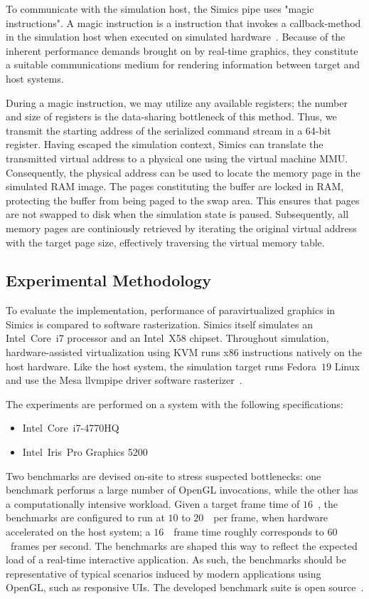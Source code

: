 To communicate with the simulation host, the Simics pipe uses "magic instructions".
A magic instruction is a  instruction that invokes a callback-method in the simulation host when executed on simulated hardware~.
Because of the inherent performance demands brought on by real-time graphics, they constitute a suitable communications medium for rendering information between target and host systems.

During a magic instruction, we may utilize any available registers; the number and size of registers is the data-sharing bottleneck of this method.
Thus, we transmit the starting address of the serialized command stream in a 64-bit register.
Having escaped the simulation context, Simics can translate the transmitted virtual address to a physical one using the virtual machine MMU.
Consequently, the physical address can be used to locate the memory page in the simulated RAM image.
The pages constituting the buffer are locked in RAM, protecting the buffer from being paged to the swap area.
This ensures that pages are not swapped to disk when the simulation state is paused.
Subsequently, all memory pages are continiously retrieved by iterating the original virtual address with the target page size, effectively traversing the virtual memory table.

\subsection{Experimental Methodology}
\label{sec:experimentalmethodology}
To evaluate the implementation, performance of paravirtualized graphics in Simics is compared to software rasterization.
Simics itself simulates an Intel\circledR ~Core\texttrademark ~i7 processor and an Intel\circledR ~X58 chipset.
Throughout simulation, hardware-assisted virtualization using KVM runs x86 instructions natively on the host hardware.
Like the host system, the simulation target runs Fedora~$19$ Linux and use the Mesa llvmpipe driver software rasterizer~.

The experiments are performed on a system with the following specifications:
\begin{itemize}
\item Intel\circledR\ Core\texttrademark\ i7-4770HQ
\item Intel\circledR\ Iris\texttrademark\ Pro Graphics 5200
\end{itemize}

Two benchmarks are devised on-site to stress suspected bottlenecks: one benchmark performs a large number of OpenGL invocations, while the other has a computationally intensive workload.
Given a target frame time of $16$~\milli\second , the benchmarks are configured to run at $10$ to $20$~\milli\second\ per frame, when hardware accelerated on the host system; a $16$~\milli\second\ frame time roughly corresponds to $60$~frames per second.
The benchmarks are shaped this way to reflect the expected load of a real-time interactive application.
As such, the benchmarks should be representative of typical scenarios induced by modern applications using OpenGL, such as responsive UIs.
The developed benchmark suite is open source~.

